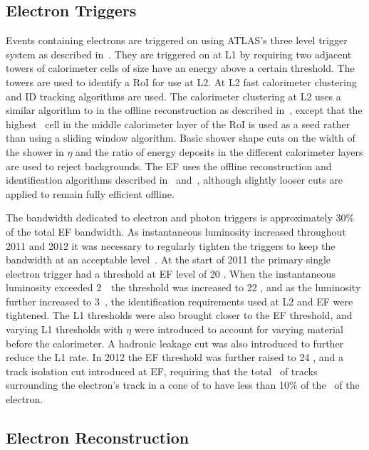 \subsection{Electron Triggers}
\label{sec:reco-el-triggers}

Events containing electrons are triggered on using ATLAS's three level trigger
system as described in~. They are triggered on at L1 by
requiring two adjacent towers of calorimeter cells of size
 have an energy above a certain threshold. The towers
are used to identify a RoI for use at L2. At L2 fast calorimeter clustering and
ID tracking
algorithms are used. The calorimeter clustering at L2 uses a similar algorithm to in
the offline reconstruction as described in~, except that the
highest \et\ cell in the middle calorimeter layer of the RoI is used as a seed
rather than using a sliding window algorithm. Basic shower shape cuts on
the width of the shower in $\eta$ and the ratio of energy deposits in the
different calorimeter layers are
used to reject backgrounds. The EF uses the offline reconstruction and
identification algorithms described in~
and~, although slightly looser cuts are applied to remain fully
efficient offline. 

The bandwidth dedicated to electron and photon triggers is approximately 30\% of the
total EF bandwidth. As instantaneous luminosity increased throughout 2011 and
2012 it was necessary to regularly tighten the triggers to keep the bandwidth at
an acceptable level~\cite{Monticelli:1450947}. At the start of 2011 the primary single electron trigger
had a threshold at EF level of 20 \gev. When the instantaneous luminosity exceeded
2~\instlumiunit\ the threshold was increased to 22 \gev, and as
the luminosity further increased to 3~\instlumiunit, the identification
requirements used at L2 and EF were tightened. The L1 thresholds were also
brought closer to the EF threshold, and varying L1 thresholds with $\eta$ were
introduced to account for varying material before the calorimeter. A hadronic
leakage cut was also introduced to further reduce the L1 rate. In 2012 the EF
threshold was further raised to 24 \gev, and a track isolation cut introduced at
EF, requiring that the total \pt\ of tracks surrounding the
electron's track in a cone of  to have less than 10\% of the \pt\ of
the electron.

\subsection{Electron Reconstruction}
\label{sec:reco-el-reco}

